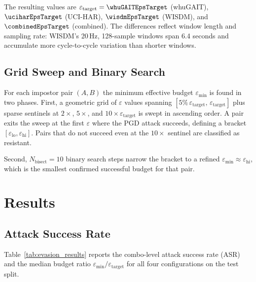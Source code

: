 The resulting values are $\varepsilon_\text{target} = \whuGAITEpsTarget$ (whuGAIT), $\uciharEpsTarget$ (UCI-HAR), $\wisdmEpsTarget$ (WISDM), and $\combinedEpsTarget$ (combined). The differences reflect window length and sampling rate: WISDM's 20\,Hz, 128-sample windows span 6.4 seconds and accumulate more cycle-to-cycle variation than shorter windows.

\subsection{Grid Sweep and Binary Search}
\label{ssec:ev_grid}

For each impostor pair $(A, B)$ the minimum effective budget $\varepsilon_\text{min}$ is found in two phases. First, a geometric grid of $\varepsilon$ values spanning $[5\%\,\varepsilon_\text{target},\,
\varepsilon_\text{target}]$ plus sparse sentinels at $2\times$, $5\times$, and
$10\times \varepsilon_\text{target}$ is swept in ascending order. A pair exits the sweep at the first $\varepsilon$ where the PGD attack succeeds, defining a bracket $[\varepsilon_\text{lo}, \varepsilon_\text{hi}]$. Pairs that do not succeed even at the $10\times$ sentinel are classified as resistant.

Second, $N_\text{bisect} = 10$ binary search steps narrow the bracket to a refined $\varepsilon_\text{min} \approx \varepsilon_\text{hi}$, which is the smallest confirmed successful budget for that pair.

\section{Results}
\label{sec:ev_results}

\subsection{Attack Success Rate}
\label{ssec:ev_asr}

Table~\ref{tab:evasion_results} reports the combo-level attack success rate (ASR) and the median budget ratio $\varepsilon_\text{min} /
\varepsilon_\text{target}$ for all four configurations on the test split.


